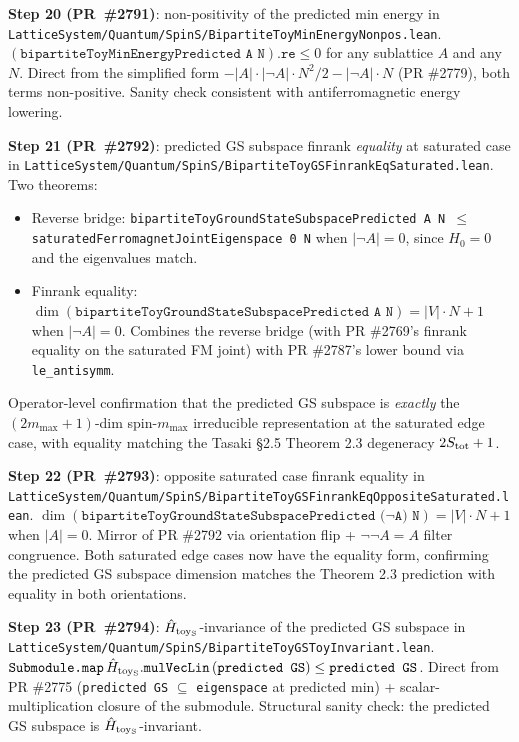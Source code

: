 \documentclass[a4paper,11pt]{article}
\begin{document}
\textbf{Step 20 (PR~\#2791)}: non-positivity of the predicted
min energy in
\texttt{LatticeSystem/Quantum/SpinS/BipartiteToyMinEnergyNonpos.lean}.
$(\texttt{bipartiteToyMinEnergyPredicted A N}).\texttt{re} \le 0$
for any sublattice $A$ and any $N$. Direct from the simplified
form $-|A|\cdot|\neg A|\cdot N^2/2 - |\neg A|\cdot N$ (PR \#2779),
both terms non-positive. Sanity check consistent with
antiferromagnetic energy lowering.

\textbf{Step 21 (PR~\#2792)}: predicted GS subspace finrank
\emph{equality} at saturated case in
\texttt{LatticeSystem/Quantum/SpinS/BipartiteToyGSFinrankEqSaturated.lean}.
Two theorems:
\begin{itemize}
\item Reverse bridge:
\texttt{bipartiteToyGroundStateSubspacePredicted A N $\le$
saturatedFerromagnetJointEigenspace 0 N} when $|\neg A| = 0$,
since $H_0 = 0$ and the eigenvalues match.
\item Finrank equality:
$\dim(\texttt{bipartiteToyGroundStateSubspacePredicted A N}) =
|V|\cdot N + 1$ when $|\neg A| = 0$. Combines the reverse bridge
(with PR \#2769's finrank equality on the saturated FM joint)
with PR \#2787's lower bound via \texttt{le\_antisymm}.
\end{itemize}
Operator-level confirmation that the predicted GS subspace is
\emph{exactly} the $(2 m_{\max}+1)$-dim spin-$m_{\max}$
irreducible representation at the saturated edge case, with
equality matching the Tasaki §2.5 Theorem 2.3 degeneracy
$2 S_{\rm tot} + 1$.

\textbf{Step 22 (PR~\#2793)}: opposite saturated case finrank
equality in
\texttt{LatticeSystem/Quantum/SpinS/BipartiteToyGSFinrankEqOppositeSaturated.lean}.
$\dim(\texttt{bipartiteToyGroundStateSubspacePredicted ($\neg$A) N})
= |V|\cdot N + 1$ when $|A| = 0$. Mirror of PR \#2792 via
orientation flip + $\neg\neg A = A$ filter congruence. Both
saturated edge cases now have the equality form, confirming the
predicted GS subspace dimension matches the Theorem 2.3 prediction
with equality in both orientations.

\textbf{Step 23 (PR~\#2794)}: $\hat H_{\rm toy_S}$-invariance of
the predicted GS subspace in
\texttt{LatticeSystem/Quantum/SpinS/BipartiteToyGSToyInvariant.lean}.
$\texttt{Submodule.map}\,\hat H_{\rm toy_S}.\texttt{mulVecLin}\,
(\texttt{predicted GS}) \le \texttt{predicted GS}$. Direct from
PR \#2775 (\texttt{predicted GS} $\subseteq$ \texttt{eigenspace} at
predicted min) + scalar-multiplication closure of the submodule.
Structural sanity check: the predicted GS subspace is
$\hat H_{\rm toy_S}$-invariant.
\end{document}
